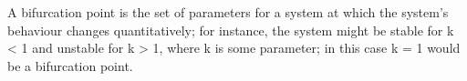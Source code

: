 A bifurcation point is the set of parameters for a system at
which the system's behaviour changes quantitatively; for 
instance, the system might be stable for k < 1 and 
unstable for k > 1, where k is some parameter; in this case
k = 1 would be a bifurcation point.